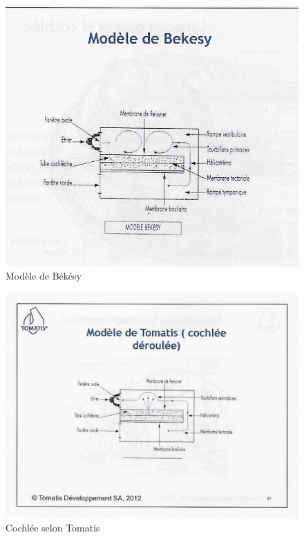 \begin{figure}
	\centering
	\includegraphics[width=0.7\linewidth]{images/Cochleederoule_bas.jpg}
	\caption[Modèle de Békésy]{Modèle de Békésy}
	\label{fig:cochleederoulebas}
\end{figure}


 \begin{figure}
	\centering
	\includegraphics[width=0.7\linewidth]{images/Cochleederoule_haut.jpg}
	\caption[Cochlée selon Tomatis]{Cochlée selon Tomatis}
	\label{fig:cochleederoulehaut}
      \end{figure}

